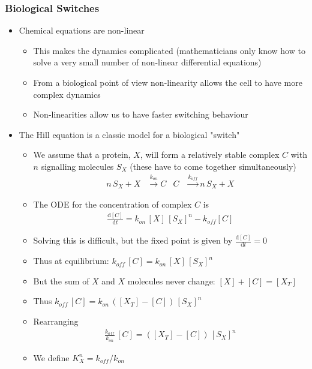 \documentclass[11pt]{article}
\newcommand{\dd}{\mathrm{d}}
\begin{document}
\subsubsection{Biological Switches}
\label{sec:org4f014ac}
\begin{itemize}
\item Chemical equations are non-linear
\begin{itemize}
\item This makes the dynamics complicated (mathematicians only know
how to solve a very small number of non-linear differential
equations)
\item From a biological point of view non-linearity allows the cell
to have more complex dynamics
\item Non-linearities allow us to have faster switching behaviour
\end{itemize}
\item The Hill equation is a classic model for a biological "switch"
\begin{itemize}
\item We assume that a protein, \(X\), will form a relatively stable
complex \(C\) with \(n\) signalling molecules \(S_X\) (these have to
come together simultaneously)\vspace*{-1ex}
\begin{align*}
  n\, S_X + X &\stackrel{k_{on}}{\longrightarrow} C
  &
  C &\stackrel{k_{off}}{\longrightarrow} n\, S_X + X
\end{align*}
\item The ODE for the concentration of complex \(C\) is
\begin{align*}
\frac{\dd [C]}{\dd t} = k_{on}\,[X]\,[S_X]^n - k_{off} [C]
\end{align*}
\item Solving this is difficult, but the fixed point is given by
\(\displaystyle \frac{\dd [C]}{\dd t} = 0\)
\item Thus at equilibrium: \(k_{off}\,[C] = k_{on}\,[X]\,[S_X]^n\)
\item But the sum of \(X\) and \(X\) molecules never change: \([X]+[C] =[X_T]\)
\item Thus \(k_{off}\,[C] = k_{on}\,([X_T]-[C])\,[S_X]^n\)
\item Rearranging\vspace*{-2ex}
 \begin{align*}
 \frac{k_{off}}{k_{on}}\,[C] = ([X_T]-[C])\,[S_X]^n
\end{align*}
\item We define \(K_X^n = k_{off}/k_{on}\)

\end{itemize}
\end{itemize}
\end{document}

